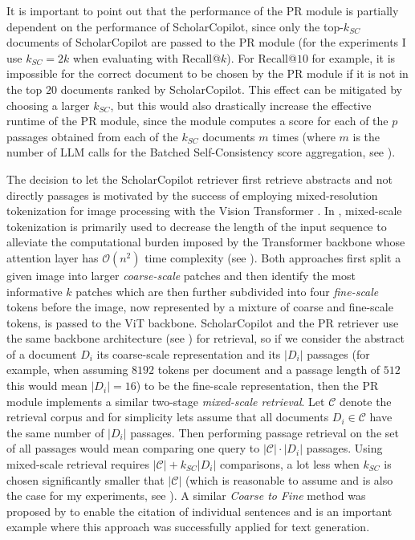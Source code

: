It is important to point out that the performance of the PR module is partially dependent on the performance of ScholarCopilot, since only the top-$k_{SC}$ documents of ScholarCopilot are passed to the PR module (for the experiments I use $k_{SC}=2k$ when evaluating with Recall@$k$). For Recall@$10$ for example, it is impossible for the correct document to be chosen by the PR module if it is not in the top $20$ documents ranked by ScholarCopilot. This effect can be mitigated by choosing a larger $k_{SC}$, but this would also drastically increase the effective runtime of the PR module, since the module computes a score for each of the $p$ passages obtained from each of the $k_{SC}$ documents $m$ times (where $m$ is the number of LLM calls for the Batched Self-Consistency score aggregation, see \cite{korikov2025batched}).

The decision to let the ScholarCopilot retriever first retrieve abstracts and not directly passages is motivated by the success of employing mixed-resolution tokenization \cite{chen2023cf,havtorn2023msvit} for image processing with the Vision Transformer \cite{dosovitskiy2020image}. In \cite{chen2023cf,havtorn2023msvit}, mixed-scale tokenization is primarily used to decrease the length of the input sequence to alleviate the computational burden imposed by the Transformer backbone whose attention layer has $\mathcal{O}(n^2)$ time complexity (see \cite{vaswani2017attention}). Both approaches first split a given image into larger \emph{coarse-scale} patches and then identify the most informative $k$ patches which are then further subdivided into four \emph{fine-scale} tokens before the image, now represented by a mixture of coarse and fine-scale tokens, is passed to the ViT backbone. ScholarCopilot and the PR retriever use the same backbone architecture (see ) for retrieval, so if we consider the abstract of a document $D_i$ its coarse-scale representation and its $|D_i|$ passages (for example, when assuming $8192$ tokens per document and a passage length of $512$ this would mean $|D_i|=16$) to be the fine-scale representation, then the PR module implements a similar two-stage \emph{mixed-scale retrieval}. Let $\mathcal{C}$ denote the retrieval corpus and for simplicity lets assume that all documents $D_i\in\mathcal{C}$ have the same number of $|D_i|$ passages. Then performing passage retrieval on the set of all passages would mean comparing one query to $|\mathcal{C}|\cdot|D_i|$ passages. Using mixed-scale retrieval requires $|\mathcal{C}|+k_{SC}|D_i|$ comparisons, a lot less when $k_{SC}$ is chosen significantly smaller that $|\mathcal{C}|$ (which is reasonable to assume and is also the case for my experiments, see ). A similar \emph{Coarse to Fine} method was proposed by \cite{zhang2024longcite} to enable the citation of individual sentences and is an important example where this approach was successfully applied for text generation.  

